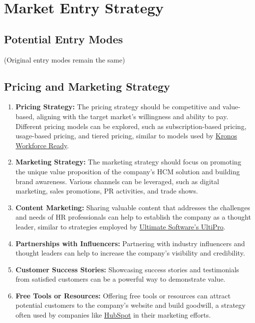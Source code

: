 \documentclass[
  a4paper,
]{book}
\renewcommand{\labelenumi}{\textbf{\textcolor{com-color}{\arabic*.}}}%
\begin{document}
\hypertarget{market-entry-strategy}{%
\section{Market Entry Strategy}\label{market-entry-strategy}}

\hypertarget{potential-entry-modes}{%
\subsection{Potential Entry Modes}\label{potential-entry-modes}}

(Original entry modes remain the same)

\hypertarget{pricing-and-marketing-strategy}{%
\subsection{Pricing and Marketing
Strategy}\label{pricing-and-marketing-strategy}}

\begin{enumerate}
\def\labelenumi{\arabic{enumi}.}
\item
  \textbf{Pricing Strategy:} The pricing strategy should be competitive
  and value-based, aligning with the target market's willingness and
  ability to pay. Different pricing models can be explored, such as
  subscription-based pricing, usage-based pricing, and tiered pricing,
  similar to models used by
  \href{https://www.kronos.com/products/workforce-ready-suite}{Kronos
  Workforce Ready}.
\item
  \textbf{Marketing Strategy:} The marketing strategy should focus on
  promoting the unique value proposition of the company's HCM solution
  and building brand awareness. Various channels can be leveraged, such
  as digital marketing, sales promotions, PR activities, and trade
  shows.
\item
  \textbf{Content Marketing:} Sharing valuable content that addresses
  the challenges and needs of HR professionals can help to establish the
  company as a thought leader, similar to strategies employed by
  \href{https://www.ultimatesoftware.com/UltiPro}{Ultimate Software's
  UltiPro}.
\item
  \textbf{Partnerships with Influencers:} Partnering with industry
  influencers and thought leaders can help to increase the company's
  visibility and credibility.
\item
  \textbf{Customer Success Stories:} Showcasing success stories and
  testimonials from satisfied customers can be a powerful way to
  demonstrate value.
\item
  \textbf{Free Tools or Resources:} Offering free tools or resources can
  attract potential customers to the company's website and build
  goodwill, a strategy often used by companies like
  \href{https://www.hubspot.com/}{HubSpot} in their marketing efforts.
\end{enumerate}
\end{document}
